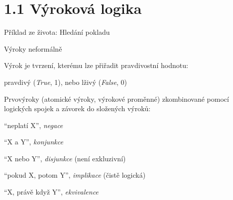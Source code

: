 \documentclass{beamer}
\begin{document}
\section{1.1 Výroková logika}


\begin{frame}{Příklad ze života: Hledání pokladu}


\end{frame}


\begin{frame}{Výroky neformálně}

    \alert{Výrok} je tvrzení, kterému lze přiřadit pravdivostní hodnotu: 
    \begin{center}
        \alert{pravdivý} (\emph{True}, 1), nebo \alert{lživý} (\emph{False}, 0)
    \end{center}

    \pause
    
    \alert{Prvovýroky} (\alert{atomické výroky}, \alert{výrokové proměnné}) zkombinované pomocí logických spojek a závorek do \alert{složených výroků}:

    \pause

    
    \medskip

    \pause

    \begin{description}\setlength{\itemsep}{3pt}
        \item[\LARGE\alert{$\neg$}] ``neplatí X'', \emph{negace}
        \item[\LARGE\alert{$\landsymb$}] ``X a Y'', \emph{konjunkce}
        \item[\LARGE\alert{$\lorsymb$}] ``X nebo Y'', \emph{disjunkce} (není exkluzivní)
        \item[\LARGE\alert{$\limpliessymb$}] ``pokud X, potom Y'', \emph{implikace} (čistě logická)
        \item[\LARGE\alert{$\liffsymb$}] ``X, právě když Y'', \emph{ekvivalence}
    \end{description}

\end{frame}
\end{document}
